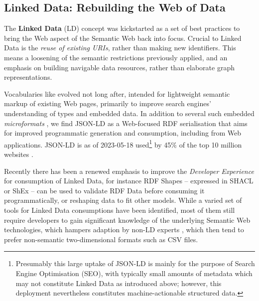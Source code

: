 \subsection{Linked Data: Rebuilding the Web of Data}\label{ch3:ld-web}

The \textbf{Linked Data} (LD) concept \cite{Bizer 2009} was kickstarted as a set of best practices \cite{LinkedDataDesign} to bring the Web aspect of the Semantic Web back into focus. Crucial to Linked Data is the \emph{reuse of existing URIs}, rather than making new identifiers. This means a loosening of the semantic restrictions previously applied, and an emphasis on building navigable data resources, rather than elaborate graph representations.

Vocabularies like  evolved not long after, intended for lightweight semantic markup of existing Web pages, primarily to improve search engines' understanding of types and embedded data. In addition to several such embedded \emph{microformats} \cite{OpenGraphProtocol,w3-rdfa-primer,HTMLStandard}, we find JSON-LD \cite{w3-json-ld} as a Web-focused RDF serialisation that aims for improved programmatic generation and consumption, including from Web applications. JSON-LD is as of 2023-05-18 used\footnote{Presumably this large uptake of JSON-LD is mainly for the purpose of Search Engine Optimisation (SEO), with typically small amounts of metadata which may not constitute Linked Data as introduced above; however, this deployment nevertheless constitutes machine-actionable structured data.} by 45\% of the top 10 million websites \cite{UsageStatisticsJSONLD}.

Recently there has been a renewed emphasis to improve the \emph{Developer Experience} \cite{DesigningLinkedData2018} for consumption of Linked Data, for instance RDF Shapes -- expressed in SHACL \cite{w3-shacl} or ShEx \cite{ShapeExpressionsShEx} -- can be used to validate RDF Data \cite{gayoValidatingRDFData2017a,thorntonUsingShapeExpressions2019a} before consuming it programmatically, or reshaping data to fit other models. While a varied set of tools for Linked Data consumptions have been identified, most of them still require developers to gain significant knowledge of the underlying Semantic Web technologies, which hampers adaption by non-LD experts \cite{klimekSurveyToolsLinked2019a}, which then tend to prefer non-semantic two-dimensional formats such as CSV files.

